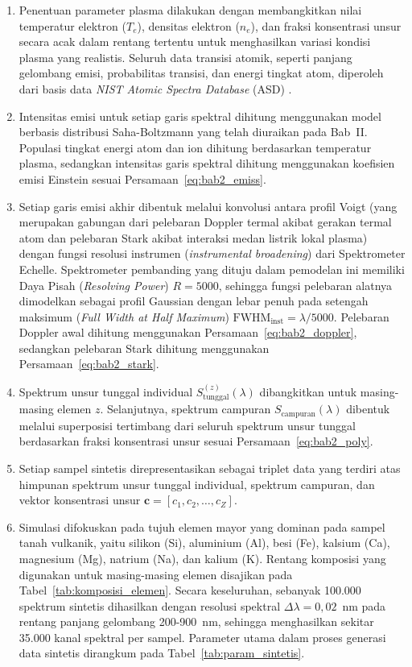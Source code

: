 \begin{enumerate}
    \item Penentuan parameter plasma dilakukan dengan membangkitkan nilai temperatur elektron ($T_e$), densitas elektron ($n_e$), dan fraksi konsentrasi unsur secara acak dalam rentang tertentu untuk menghasilkan variasi kondisi plasma yang realistis. Seluruh data transisi atomik, seperti panjang gelombang emisi, probabilitas transisi, dan energi tingkat atom, diperoleh dari basis data \textit{NIST Atomic Spectra Database} (ASD) \citep{kramida_nist_2024}.

    \item Intensitas emisi untuk setiap garis spektral dihitung menggunakan model berbasis distribusi Saha-Boltzmann yang telah diuraikan pada Bab~II. Populasi tingkat energi atom dan ion dihitung berdasarkan temperatur plasma, sedangkan intensitas garis spektral dihitung menggunakan koefisien emisi Einstein sesuai Persamaan~\ref{eq:bab2_emiss}.

    \item Setiap garis emisi akhir dibentuk melalui konvolusi antara profil Voigt (yang merupakan gabungan dari pelebaran Doppler termal akibat gerakan termal atom dan pelebaran Stark akibat interaksi medan listrik lokal plasma) dengan fungsi resolusi instrumen (\textit{instrumental broadening}) dari Spektrometer Echelle. Spektrometer pembanding yang dituju dalam pemodelan ini memiliki Daya Pisah (\textit{Resolving Power}) $R = 5000$, sehingga fungsi pelebaran alatnya dimodelkan sebagai profil Gaussian dengan lebar penuh pada setengah maksimum (\textit{Full Width at Half Maximum}) $\text{FWHM}_{\text{inst}} = \lambda / 5000$. Pelebaran Doppler awal dihitung menggunakan Persamaan~\ref{eq:bab2_doppler}, sedangkan pelebaran Stark dihitung menggunakan Persamaan~\ref{eq:bab2_stark}.

    \item Spektrum unsur tunggal individual $S_{\mathrm{tunggal}}^{(z)}(\lambda)$ dibangkitkan untuk masing-masing elemen $z$. Selanjutnya, spektrum campuran $S_{\mathrm{campuran}}(\lambda)$ dibentuk melalui superposisi tertimbang dari seluruh spektrum unsur tunggal berdasarkan fraksi konsentrasi unsur sesuai Persamaan~\ref{eq:bab2_poly}.

    \item Setiap sampel sintetis direpresentasikan sebagai triplet data yang terdiri atas himpunan spektrum unsur tunggal individual, spektrum campuran, dan vektor konsentrasi unsur $\mathbf{c} = [c_1, c_2, \ldots, c_Z]$.

    \item Simulasi difokuskan pada tujuh elemen mayor yang dominan pada sampel tanah vulkanik, yaitu silikon (Si), aluminium (Al), besi (Fe), kalsium (Ca), magnesium (Mg), natrium (Na), dan kalium (K). Rentang komposisi yang digunakan untuk masing-masing elemen disajikan pada Tabel~\ref{tab:komposisi_elemen}. Secara keseluruhan, sebanyak 100.000 spektrum sintetis dihasilkan dengan resolusi spektral $\Delta\lambda = 0{,}02$~nm pada rentang panjang gelombang 200-900~nm, sehingga menghasilkan sekitar 35.000 kanal spektral per sampel. Parameter utama dalam proses generasi data sintetis dirangkum pada Tabel~\ref{tab:param_sintetis}.
\end{enumerate}

